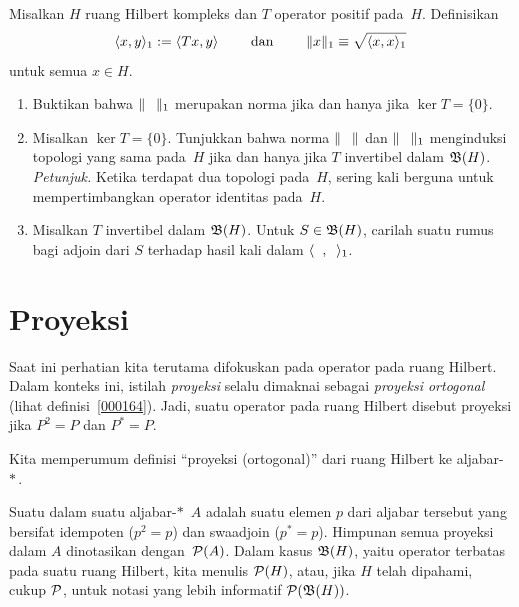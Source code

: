\begin{exer} Misalkan $H$ ruang Hilbert kompleks dan $T$ operator positif pada~$H$.  Definisikan
   \[ \langle x,y \rangle_1 := \langle Tx,y \rangle \qquad \text{ dan } \qquad \lVert x\rVert_1 \equiv \sqrt{\langle x,x \rangle_1} \]
untuk semua $x \in H$.
 \begin{enumerate}
  \item[(a)] Buktikan bahwa $\norm{\hphantom O}_1$ merupakan norma jika dan hanya jika $\ker T = \{0\}$.
  \item[(b)] Misalkan $\ker T = \{0\}$. Tunjukkan bahwa norma $\norm{\hphantom O}$ dan
$\norm{\hphantom O}_1$ menginduksi topologi yang sama pada~$H$ jika dan hanya jika $T$ invertibel dalam
$\mathfrak{B}(H)$. \emph{Petunjuk.}  Ketika terdapat dua topologi pada~$H$, sering kali berguna untuk
mempertimbangkan operator identitas pada~$H$.
  \item[(c)] Misalkan $T$ invertibel dalam $\mathfrak{B}(H)$.  Untuk $S \in \mathfrak{B}(H)$, carilah suatu rumus bagi
adjoin dari $S$ terhadap hasil kali dalam $\langle \hphantom x , \hphantom y \rangle_1$.
 \end{enumerate}
\end{exer}


















\section{Proyeksi}
\begin{conv} Saat ini perhatian kita terutama difokuskan pada
operator pada ruang Hilbert.  Dalam konteks ini, istilah \emph{proyeksi} selalu dimaknai
sebagai \emph{proyeksi ortogonal} (lihat definisi~\ref{000164}). Jadi, suatu operator pada ruang Hilbert
disebut proyeksi jika $P^2 = P$ dan $P^* = P$.
\end{conv}

Kita memperumum definisi ``proyeksi (ortogonal)'' dari ruang Hilbert ke aljabar-$*\,$.

\begin{defn} Suatu
 dalam suatu aljabar-$*\,$ $A$ adalah suatu elemen $p$ dari aljabar tersebut yang bersifat
idempoten ($p^2 = p$) dan swaadjoin ($p^* = p$).  Himpunan semua proyeksi dalam $A$
dinotasikan
dengan~$\mathcal{P}(A)$.  Dalam kasus $\mathfrak{B}(H)$, yaitu operator terbatas pada suatu ruang Hilbert,
kita menulis $\mathcal{P}(H)$,
atau, jika $H$ telah dipahami, cukup $\mathcal{P}$, untuk notasi yang lebih informatif $\mathcal{P}(\mathfrak{B}(H))$.
\end{defn}


